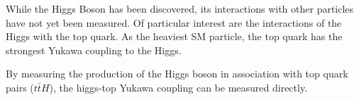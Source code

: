 While the Higgs Boson has been discovered, its interactions with other particles have not yet been measured. Of particular interest are the interactions of the Higgs with the top quark. As the heaviest SM particle, the top quark has the strongest Yukawa coupling to the Higgs. 

By measuring the production of the Higgs boson in association with top quark pairs ($t\bar{t}H$), the higgs-top Yukawa coupling can be measured directly. 